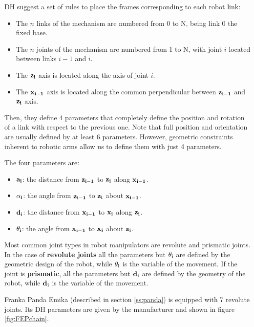 DH suggest a set of rules to place the frames corresponding to each robot link:

\begin{itemize}
    \item The $n$ links of the mechanism are numbered from 0 to N, being link 0 the fixed base.
    \item The $n$ joints of the mechanism are numbered from 1 to N, with joint $i$ located between links $i-1$ and $i$.
    \item The $\bf{z_i}$ axis is located along the axis of joint $i$.
    \item The $\bf{x_{i-1}}$ axis is located along the common perpendicular between $\bf{z_{i-1}}$ and $\bf{z_i}$ axis.
\end{itemize}

Then, they define 4 parameters that completely define the position and rotation of a link with respect to the previous one. Note that full position and orientation are usually defined by at least 6 parameters. However, geometric constraints inherent to robotic arms allow us to define them with just 4 parameters.

The four parameters are:

\begin{itemize}
    \item $\bf{a_i}$: the distance from $\bf{z_{i-1}}$ to $\bf{z_{i}}$ along $\bf{x_{i-1}}$.
    \item $\bf{\alpha_i}$: the angle from $\bf{z_{i-1}}$ to $\bf{z_{i}}$ about $\bf{x_{i-1}}$.
    \item $\bf{d_i}$: the distance from $\bf{x_{i-1}}$ to $\bf{x_{i}}$ along $\bf{z_{i}}$.
    \item $\bf{\theta_i}$: the angle from $\bf{x_{i-1}}$ to $\bf{x_{i}}$ about $\bf{z_{i}}$.
\end{itemize}

Most common joint types in robot manipulators are revolute and prismatic joints. In the case of \textbf{revolute joints} all the parameters but $\bf{\theta_i}$ are defined by the geometric design of the robot, while $\bf{\theta_i}$ is the variable of the movement. If the joint is \textbf{prismatic}, all the parameters but $\bf{d_i}$ are defined by the geometry of the robot, while $\bf{d_i}$ is the variable of the movement.

Franka Panda Emika (described in section \ref{ss:panda}) is equipped with 7 revolute joints. Its DH parameters are given by the manufacturer and shown in figure \ref{fig:FEPchain}.

